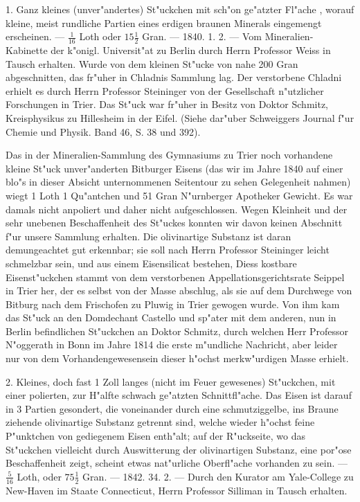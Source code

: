 \documentclass[a4paper, 11pt, oneside, polutonikogreek, german]{article}
\begin{document}
1. Ganz kleines (unver"andertes) St"uckchen mit sch"on ge"atzter Fl"ache , worauf kleine, meist rundliche Partien eines erdigen braunen Minerals eingemengt erscheinen. --- $\mathfrak{\frac{1}{16}}$ Loth oder $\mathfrak{15\frac{1}{2}}$ Gran. --- 1840. 1. 2. --- Vom Mineralien-Kabinette der k"onigl. Universit"at zu Berlin durch Herrn Professor Weiss in Tausch erhalten. Wurde von dem kleinen St"ucke von nahe 200 Gran abgeschnitten, das fr"uher in Chladnis Sammlung lag. Der verstorbene Chladni erhielt es durch Herrn Professor Steininger von der Gesellschaft n"utzlicher Forschungen in Trier. Das St"uck war fr"uher in Besitz von Doktor Schmitz, Kreisphysikus zu Hillesheim in der Eifel. (Siehe dar"uber Schweiggers Journal f"ur Chemie und Physik. Band 46, S. 38 und 392).

\setlength{\leftskip}{10mm}
\setlength{\parindent}{0pt}

{\footnotesize Das in der Mineralien-Sammlung des Gymnasiums zu Trier noch vorhandene kleine St"uck unver"anderten Bitburger Eisens (das wir im Jahre 1840 auf einer blo"s in dieser Absicht unternommenen Seitentour zu sehen Gelegenheit nahmen) wiegt 1 Loth 1 Qu"antchen und 51 Gran N"urnberger Apotheker Gewicht. Es war damals nicht anpoliert und daher nicht aufgeschlossen. Wegen Kleinheit und der sehr unebenen Beschaffenheit des St"uckes konnten wir davon keinen Abschnitt f"ur unsere Sammlung erhalten. Die olivinartige Substanz ist daran demungeachtet gut erkennbar; sie soll nach Herrn Professor Steininger leicht schmelzbar sein, und aus einem Eisensilicat bestehen, Diess kostbare Eisenst"uckchen stammt von dem verstorbenen Appellationsgerichtsrate Seippel in Trier her, der es selbst von der Masse abschlug, als sie auf dem Durchwege von Bitburg nach dem Frischofen zu Pluwig in Trier gewogen wurde. Von ihm kam das St"uck an den Domdechant Castello und sp"ater mit dem anderen, nun in Berlin befindlichen St"uckchen an Doktor Schmitz, durch welchen Herr Professor N"oggerath in Bonn im Jahre 1814 die erste m"undliche Nachricht, aber leider nur von dem Vorhandengewesensein dieser h"ochst merkw"urdigen Masse erhielt.}

\setlength{\leftskip}{0pt}
\setlength{\parindent}{20pt}

2. Kleines, doch fast 1 Zoll langes (nicht im Feuer gewesenes) St"uckchen, mit einer polierten, zur H"alfte schwach ge"atzten Schnittfl"ache. Das Eisen ist darauf in 3 Partien gesondert, die voneinander durch eine schmutziggelbe, ins Braune ziehende olivinartige Substanz getrennt sind, welche wieder h"ochst feine P"unktchen von gediegenem Eisen enth"alt; auf der R"uckseite, wo das St"uckchen vielleicht durch Auswitterung der olivinartigen Substanz, eine por"ose Beschaffenheit zeigt, scheint etwas nat"urliche Oberfl"ache vorhanden zu sein. --- $\mathfrak{\frac{5}{16}}$ Loth, oder $\mathfrak{75\frac{1}{2}}$ Gran. --- 1842. 34. 2. --- Durch den Kurator am Yale-College zu New-Haven im Staate Connecticut, Herrn Professor Silliman in Tausch erhalten.
\end{document}
